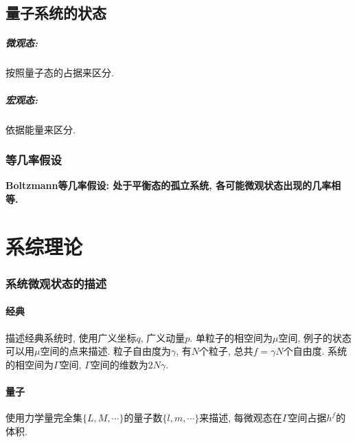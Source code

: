 \section{量子系统的状态}
\paragraph{微观态:} 按照量子态的占据来区分.
\paragraph{宏观态:} 依据能量来区分.

\subsection{等几率假设}
\textbf{Boltzmann等几率假设: 处于平衡态的孤立系统, 各可能微观状态出现的几率相等.}


\chapter{系综理论}
\subsection{系统微观状态的描述}

\subsubsection{经典}
描述经典系统时, 使用广义坐标$q$, 广义动量$p$. 单粒子的相空间为$\mu$空间, 例子的状态可以用$\mu$空间的点来描述. 粒子自由度为$\gamma$, 有$N$个粒子, 总共$f=\gamma N$个自由度. 系统的相空间为$\Gamma$空间, $\Gamma$空间的维数为$2 N \gamma$.

\subsubsection{量子}
使用力学量完全集$\{L,M, \cdots\}$的量子数$\{l,m,\cdots\}$来描述, 每微观态在$\Gamma$空间占据$h^f$的体积.
